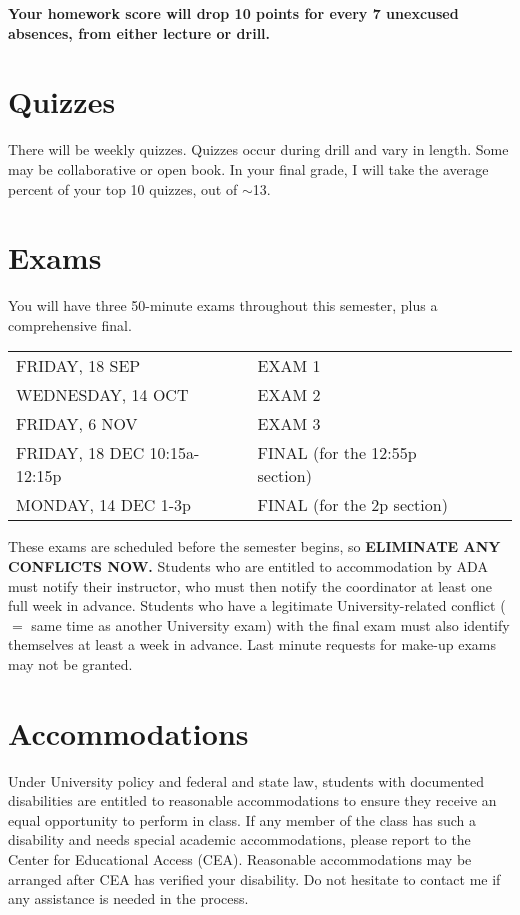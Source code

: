 \documentclass[margin,line,pifont,palatino,courier]{res}
\begin{document}
\begin{resume}
{\bf Your homework score will drop 10 points for every 7 unexcused absences, from either lecture or drill.}  

\section{\sc Quizzes} There will be weekly quizzes.  Quizzes occur during drill and vary in length.  Some may be collaborative or open book.  In your final grade, I will take the average percent of your top 10 quizzes, out of $\sim$13.   

\section{\sc Exams} You will have three 50-minute exams throughout this semester, plus a comprehensive final.  

{\bf
\begin{tabular}{llll}
FRIDAY, 18 SEP & EXAM 1 \\
WEDNESDAY, 14 OCT & EXAM 2 \\
FRIDAY, 6 NOV & EXAM 3  \\
FRIDAY, 18 DEC 10:15a-12:15p & FINAL (for the 12:55p section) \\
MONDAY, 14 DEC 1-3p & FINAL (for the 2p section) 
\end{tabular} 
}

These exams are scheduled before the semester begins, so {\bf ELIMINATE ANY CONFLICTS NOW.} Students who are entitled to accommodation by ADA must notify their instructor, who must then notify the coordinator at least one full week in advance. Students who have a legitimate University-related conflict ($=$ same time as another University exam) with the final exam must also identify themselves at least a week in advance. Last minute requests for make-up exams may not be granted. 

\section{\sc Accommodations} Under University policy and federal and state law, students with documented disabilities are entitled to reasonable accommodations to ensure they receive an equal opportunity to perform in class.  If any member of the class has such a disability and needs special academic accommodations, please report to the Center for Educational Access (CEA).  Reasonable accommodations may be arranged after CEA has verified your disability.  Do not hesitate to contact me if any assistance is needed in the process.
 

\end{resume}
\end{document}
